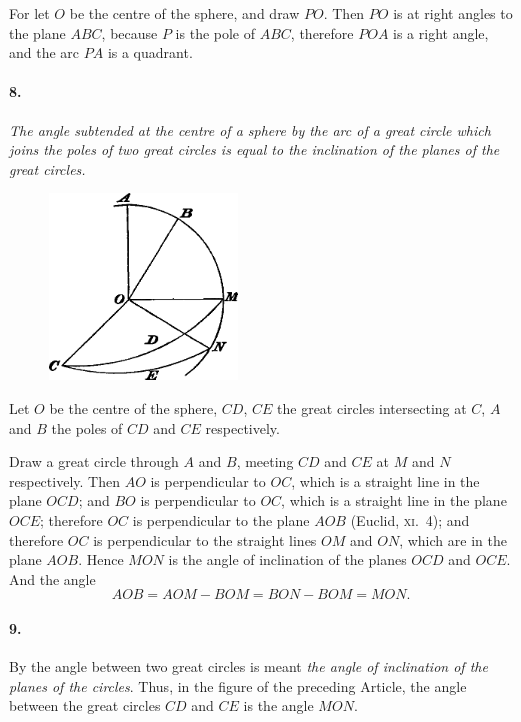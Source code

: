 \documentclass{book}[2004/02/16]
\begin{document}
\begin{mainmatter}
\begin{spacing}{1.3}
For let $O$ be the centre of the sphere, and draw $PO$. Then
$PO$ is at right angles to the plane $ABC$, because $P$ is the pole of
$ABC$, therefore $POA$ is a right angle, and the arc $PA$ is a quadrant.

\paragraph{8.} \textit{The angle subtended at the centre of a sphere by the arc of
a great circle which joins the poles of two great circles is equal to the
inclination of the planes of the great circles.}
\begin{figure}[htp]
\centering
\includegraphics[width=5cm]{images/014fc}
\end{figure}

Let $O$ be the centre of the sphere, $CD$, $CE$ the great circles intersecting
at $C$, $A$ and $B$ the poles of $CD$ and $CE$ respectively.

Draw a great circle through $A$ and $B$, meeting $CD$ and $CE$ at
$M$ and $N$ respectively. Then $AO$ is perpendicular to $OC$, which is
a straight line in the plane $OCD$; and $BO$ is perpendicular to $OC$,
which is a straight line in the plane $OCE$; therefore $OC$ is perpendicular
to the plane $AOB$ (Euclid, \textsc{xi}.~4); and therefore $OC$ is
perpendicular to the straight lines $OM$ and $ON$, which are in the
plane $AOB$. Hence $MON$ is the angle of inclination of the planes
$OCD$ and $OCE$. And the angle
\[
AOB = AOM - BOM = BON - BOM = MON.
\]

\paragraph{9.} By the angle between two great circles is meant \textit{the angle
of inclination of the planes of the circles}. Thus, in the figure of
the preceding Article, the angle between the great circles $CD$ and
$CE$ is the angle $MON$.


\end{spacing}
\end{mainmatter}
\end{document}
